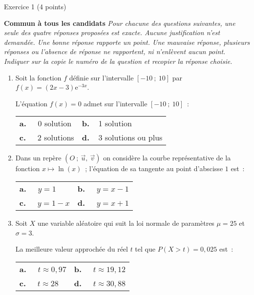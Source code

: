 
%
\begin{h2}Exercice 1 (4 points)\end{h2}
\textbf{Commun à  tous les candidats}
\medbreak
\emph{Pour chacune des questions suivantes, une seule des quatre réponses proposées est exacte. Aucune justification n'est demandée. Une bonne réponse rapporte un point. Une mauvaise réponse, plusieurs réponses ou l'absence de réponse ne rapportent, ni n'enlèvent aucun point.}
\medbreak
\emph{Indiquer sur la copie le numéro de la question et recopier la réponse choisie.}
\medbreak
\begin{enumerate}
     \item Soit la fonction $f$ définie sur l'intervalle $[-10~;~10]$ par $f(x) = (2x - 3)\text{e}^{-3x}$.
     \par
     L'équation $f(x) = 0$ admet sur l'intervalle $[-10~;~10]$~:
     \begin{tabularx}{\linewidth}{XX} %
          \textbf{a.~~} 0 solution&\textbf{b.~~}1 solution\\
          \textbf{c.~~} 2 solutions&\textbf{d.~~}3 solutions ou plus\\
     \end{tabularx}
     \item  Dans un repère $(O~;~\overrightarrow{u},~\overrightarrow{v})$ on considère la courbe représentative de la fonction $x \longmapsto \ln (x)$~; l'équation de sa tangente au point d'abscisse $1$ est~:
     \begin{tabularx}{\linewidth}{XX} %
          \textbf{a.~~} $y= 1$ &\textbf{b.~~} $y = x-1$ \\
          \textbf{c.~~} $y = 1- x$ &\textbf{d.~~} $y = x+ 1$\\
     \end{tabularx}
     \item  Soit $X$ une variable aléatoire qui suit la loi normale de paramètres $\mu = 25$ et $\sigma = 3$.
     \par
     La meilleure valeur approchée du réel $t$ tel que $P(X > t) = 0,025$ est~:
     \begin{tabularx}{\linewidth}{XX} %
          \textbf{a.~~} $t \approx 0,97$ &\textbf{b.~~} $t \approx 19,12$ \\
          \textbf{c.~~} $t \approx 28$ &\textbf{d.~~} $t \approx 30,88$\\

\end{tabularx}
\end{enumerate}
